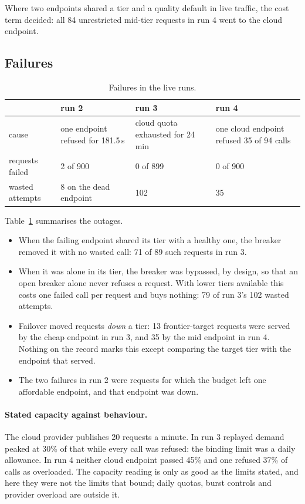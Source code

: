 \documentclass[11pt]{article}
\begin{document}
Where two endpoints shared a tier and a quality default in live traffic, the cost term decided:
all 84 unrestricted mid-tier requests in run 4 went to the cloud endpoint.

\subsection{Failures}

\begin{table}[t]
\centering
\small
\caption{Failures in the live runs.}
\label{tab:failures}
\begin{tabular}{@{}lp{3.6cm}p{3.6cm}p{3.6cm}@{}}
\toprule
 & run 2 & run 3 & run 4 \\
\midrule
cause & one endpoint refused for 181.5\,s & cloud quota exhausted for 24 min & one cloud endpoint refused 35 of 94 calls \\
requests failed & 2 of 900 & 0 of 899 & 0 of 900 \\
wasted attempts & 8 on the dead endpoint & 102 & 35 \\
\bottomrule
\end{tabular}
\end{table}

Table~\ref{tab:failures} summarises the outages.
\begin{itemize}
  \item When the failing endpoint shared its tier with a healthy one, the breaker removed it
    with no wasted call: 71 of 89 such requests in run 3.
  \item When it was alone in its tier, the breaker was bypassed, by design, so that an open
    breaker alone never refuses a request. With lower tiers available this costs one failed call
    per request and buys nothing: 79 of run 3's 102 wasted attempts.
  \item Failover moved requests \emph{down} a tier: 13 frontier-target requests were served by
    the cheap endpoint in run 3, and 35 by the mid endpoint in run 4. Nothing on the record marks
    this except comparing the target tier with the endpoint that served.
  \item The two failures in run 2 were requests for which the budget left one affordable
    endpoint, and that endpoint was down.
\end{itemize}

\paragraph{Stated capacity against behaviour.} The cloud provider publishes 20 requests a minute.
In run 3 replayed demand peaked at 30\% of that while every call was refused: the binding limit
was a daily allowance. In run 4 neither cloud endpoint passed 45\% and one refused 37\% of calls
as overloaded. The capacity reading is only as good as the limits stated, and here they were not
the limits that bound; daily quotas, burst controls and provider overload are outside it.
\end{document}
